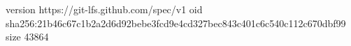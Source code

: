version https://git-lfs.github.com/spec/v1
oid sha256:21b46c67c1b2a2d6d92bebe3fcd9e4cd327bec843c401c6c540c112c670dbf99
size 43864
